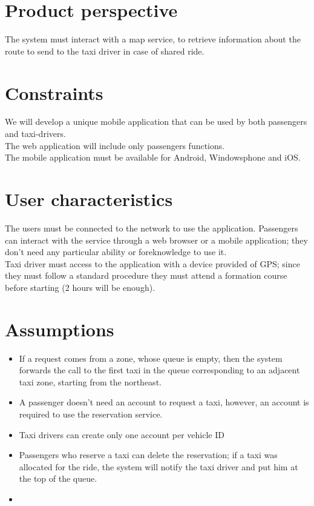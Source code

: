 \section{Product perspective}
The system must interact with a map service, to retrieve information about the route to send to the taxi driver in case of shared ride.


\section{Constraints}
We will develop a unique mobile application that can be used by both passengers and taxi-drivers.\\
The web application will include only passengers functions.\\
The mobile application must be available for Android, Windowsphone and iOS.\\


\section{User characteristics}
The users must be connected to the network to use the application.
Passengers can interact with the service through a web browser or a mobile application; they don't need any particular ability or foreknowledge to use it.\\
Taxi driver must access to the application with a device provided of GPS; since they must follow a standard procedure they must attend a formation course before starting (2 hours will be enough).\\


\section{Assumptions}
\begin{itemize}
  \item If a request comes from a zone, whose queue is empty, then the system forwards the call to the first taxi in the queue corresponding to an adjacent taxi zone, starting from the northeast.
  \item A passenger doesn't need an account to request a taxi, however, an account is required to use the reservation service. %
  \item Taxi drivers can create only one account per vehicle ID %
  \item Passengers who reserve a taxi can delete the reservation; if a taxi was allocated for the ride, the system will notify the taxi driver and put him at the top of the queue.
  \item
\end{itemize} 

